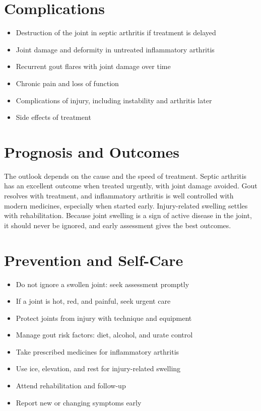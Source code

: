 \section*{Complications}
\begin{itemize}
    \item Destruction of the joint in septic arthritis if treatment is delayed
    \item Joint damage and deformity in untreated inflammatory arthritis
    \item Recurrent gout flares with joint damage over time
    \item Chronic pain and loss of function
    \item Complications of injury, including instability and arthritis later
    \item Side effects of treatment
\end{itemize}

\section*{Prognosis and Outcomes}
The outlook depends on the cause and the speed of treatment. Septic arthritis has an excellent outcome when treated urgently, with joint damage avoided. Gout resolves with treatment, and inflammatory arthritis is well controlled with modern medicines, especially when started early. Injury-related swelling settles with rehabilitation. Because joint swelling is a sign of active disease in the joint, it should never be ignored, and early assessment gives the best outcomes.

\section*{Prevention and Self-Care}
\begin{itemize}
    \item Do not ignore a swollen joint: seek assessment promptly
    \item If a joint is hot, red, and painful, seek urgent care
    \item Protect joints from injury with technique and equipment
    \item Manage gout risk factors: diet, alcohol, and urate control
    \item Take prescribed medicines for inflammatory arthritis
    \item Use ice, elevation, and rest for injury-related swelling
    \item Attend rehabilitation and follow-up
    \item Report new or changing symptoms early
\end{itemize}

